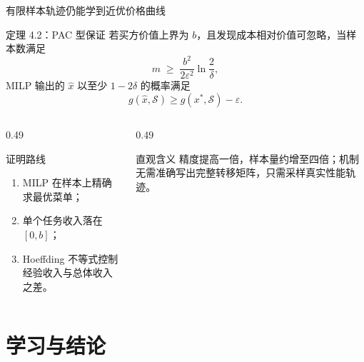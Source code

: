 \documentclass[10pt,aspectratio=169]{beamer}
\begin{document}
\begin{frame}{有限样本轨迹仍能学到近优价格曲线}
  \small
  \begin{alertblock}{定理 4.2：PAC 型保证}
    若买方价值上界为 $b$，且发现成本相对价值可忽略，当样本数满足
    \[
      m\;\ge\;\frac{b^2}{2\varepsilon^2}\ln\frac{2}{\delta},
    \]
    MILP 输出的 $\widehat x$ 以至少 $1-2\delta$ 的概率满足
    \[
      g(\widehat x,\mathcal S)\ge g(x^*,\mathcal S)-\varepsilon.
    \]
  \end{alertblock}
  \begin{columns}[T,onlytextwidth]
    \begin{column}{0.49\textwidth}
      \begin{block}{证明路线}
        \begin{enumerate}
          \item MILP 在样本上精确求最优菜单；
          \item 单个任务收入落在 $[0,b]$；
          \item Hoeffding 不等式控制经验收入与总体收入之差。
        \end{enumerate}
      \end{block}
    \end{column}
    \begin{column}{0.49\textwidth}
      \begin{block}{直观含义}
        精度提高一倍，样本量约增至四倍；机制无需准确写出完整转移矩阵，只需采样真实性能轨迹。
      \end{block}
    \end{column}
  \end{columns}
\end{frame}

\section{学习与结论}
\end{document}

